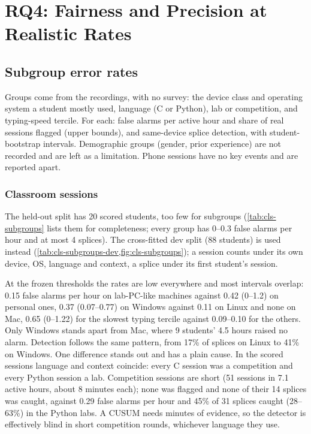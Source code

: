 \chapter{RQ4: Fairness and Precision at Realistic Rates}
\label{ch:rq4}
\section{Subgroup error rates}
Groups come from the recordings, with no survey: the device class and operating system
a student mostly used, language (C or Python), lab or competition, and typing-speed
tercile. For each: false alarms per active hour and share of real sessions flagged
(upper bounds), and same-device splice detection, with student-bootstrap intervals.
Demographic groups (gender, prior experience) are not recorded and are left as a
limitation. Phone sessions have no key events and are reported apart.

\subsection*{Classroom sessions}
The held-out split has 20 scored students, too few for subgroups (\cref{tab:cls-subgroups}
lists them for completeness; every group has 0--0.3 false alarms per hour and at most 4
splices). The cross-fitted dev split (88 students) is used instead
(\cref{tab:cls-subgroups-dev,fig:cls-subgroups}); a session counts under its own device, OS,
language and context, a splice under its first student's session.

At the frozen thresholds the rates are low everywhere and most intervals overlap: 0.15 false
alarms per hour on lab-PC-like machines against 0.42 (0--1.2) on personal ones, 0.37
(0.07--0.77) on Windows against 0.11 on Linux and none on Mac, 0.65 (0--1.22) for the slowest
typing tercile against 0.09--0.10 for the others. Only Windows stands apart from Mac, where 9
students' 4.5 hours raised no alarm. Detection follows the same pattern, from 17\%
of splices on Linux to 41\% on Windows. One difference stands out and has a plain cause. In
the scored sessions language and context coincide: every C session was a competition and
every Python session a lab. Competition sessions are short (51 sessions in 7.1 active hours,
about 8 minutes each); none was flagged and none of their 14 splices was caught, against 0.29
false alarms per hour and 45\% of 31 splices caught (28--63\%) in the Python labs. A CUSUM
needs minutes of evidence, so the detector is effectively blind in short competition rounds,
whichever language they use.

